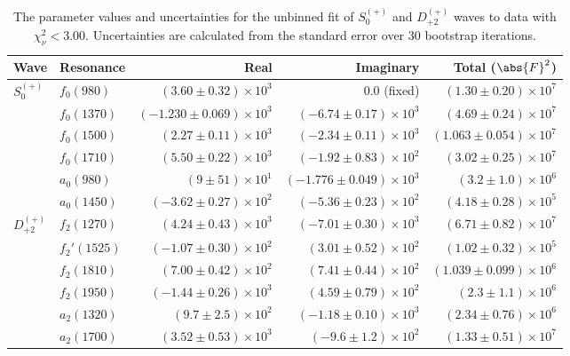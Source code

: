 \begin{table}[ht]
    \begin{center}
        \begin{tabular}{llrrr}\toprule
        Wave & Resonance & Real & Imaginary & Total ($\abs{F}^2$) \\\midrule
$S_{0}^{(+)}$ & $f_{0}(980)$ & $(3.60 \pm 0.32) \times 10^{3}$ & $0.0$ (fixed) & $(1.30 \pm 0.20) \times 10^{7}$ \\
 & $f_{0}(1370)$ & $(-1.230 \pm 0.069) \times 10^{3}$ & $(-6.74 \pm 0.17) \times 10^{3}$ & $(4.69 \pm 0.24) \times 10^{7}$ \\
 & $f_{0}(1500)$ & $(2.27 \pm 0.11) \times 10^{3}$ & $(-2.34 \pm 0.11) \times 10^{3}$ & $(1.063 \pm 0.054) \times 10^{7}$ \\
 & $f_{0}(1710)$ & $(5.50 \pm 0.22) \times 10^{3}$ & $(-1.92 \pm 0.83) \times 10^{2}$ & $(3.02 \pm 0.25) \times 10^{7}$ \\
 & $a_{0}(980)$ & $(9 \pm 51) \times 10^{1}$ & $(-1.776 \pm 0.049) \times 10^{3}$ & $(3.2 \pm 1.0) \times 10^{6}$ \\
 & $a_{0}(1450)$ & $(-3.62 \pm 0.27) \times 10^{2}$ & $(-5.36 \pm 0.23) \times 10^{2}$ & $(4.18 \pm 0.28) \times 10^{5}$ \\
$D_{+2}^{(+)}$ & $f_{2}(1270)$ & $(4.24 \pm 0.43) \times 10^{3}$ & $(-7.01 \pm 0.30) \times 10^{3}$ & $(6.71 \pm 0.82) \times 10^{7}$ \\
 & $f_{2}'(1525)$ & $(-1.07 \pm 0.30) \times 10^{2}$ & $(3.01 \pm 0.52) \times 10^{2}$ & $(1.02 \pm 0.32) \times 10^{5}$ \\
 & $f_{2}(1810)$ & $(7.00 \pm 0.42) \times 10^{2}$ & $(7.41 \pm 0.44) \times 10^{2}$ & $(1.039 \pm 0.099) \times 10^{6}$ \\
 & $f_{2}(1950)$ & $(-1.44 \pm 0.26) \times 10^{3}$ & $(4.59 \pm 0.79) \times 10^{2}$ & $(2.3 \pm 1.1) \times 10^{6}$ \\
 & $a_{2}(1320)$ & $(9.7 \pm 2.5) \times 10^{2}$ & $(-1.18 \pm 0.10) \times 10^{3}$ & $(2.34 \pm 0.76) \times 10^{6}$ \\
 & $a_{2}(1700)$ & $(3.52 \pm 0.53) \times 10^{3}$ & $(-9.6 \pm 1.2) \times 10^{2}$ & $(1.33 \pm 0.51) \times 10^{7}$ \\\bottomrule
        \end{tabular}
    \caption{The parameter values and uncertainties for the unbinned fit of $S_{0}^{(+)}$ and $D_{+2}^{(+)}$ waves to data with $\chi^2_\nu < 3.00$. Uncertainties are calculated from the standard error over $30$ bootstrap iterations.}\label{tab:unbinned-fit-chisqdof-3.0-Sp0p-Dp2p}
    \end{center}
\end{table}
